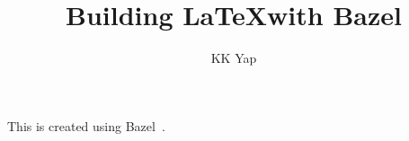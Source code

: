 \documentclass{article}
\begin{document}
\title{Building \LaTeX with Bazel}
\author{KK Yap}
\maketitle

This is created using Bazel~\cite{bazel}.



\end{document}
